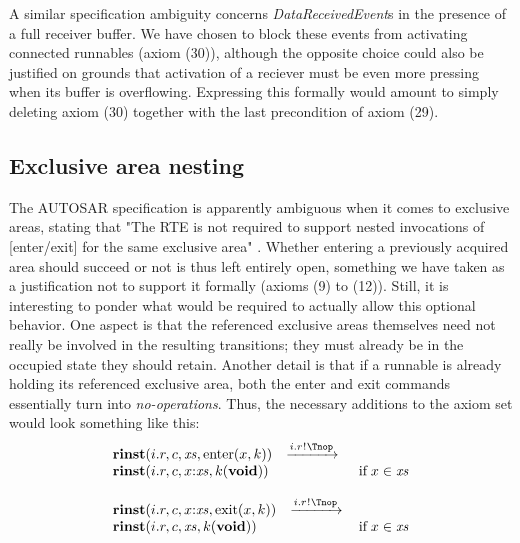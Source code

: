 \documentclass[twocolumn]{article}
\begin{document}
A similar specification ambiguity concerns \emph{DataReceivedEvent}s in the presence of a full receiver buffer. We have chosen to block these events from activating connected runnables (axiom (30)), although the opposite choice could also be justified on grounds that activation of a reciever must be even more pressing when its buffer is overflowing. Expressing this formally would amount to simply deleting axiom (30) together with the last precondition of axiom (29).


\subsection{Exclusive area nesting} \label{sec:ExclNest}

The AUTOSAR specification is apparently ambiguous when it comes to exclusive areas, stating that "The RTE is not required to support nested invocations of [enter/exit] for the same exclusive area" \cite[ch.~5.6.28-29]{AR:RTE}. Whether entering a previously acquired area should succeed or not is thus left entirely open, something we have taken as a justification not to support it formally (axioms (9) to (12)). Still, it is interesting to ponder what would be required to actually allow this optional behavior. One aspect is that the referenced exclusive areas themselves need not really be involved in the resulting transitions; they must already be in the occupied state they should retain. Another detail is that if a runnable is already holding its referenced exclusive area, both the enter and exit commands essentially turn into \emph{no-operations}. Thus, the necessary additions to the axiom set would look something like this:
$$
\begin{array}{lcll}
		{\Trinst {i.r} c \Xs {\TrteEnter x k}}
		\;\; \red{\Tsay {i.r} \Tnop} \\
		{\Trinst {i.r} c {\Tcons x \Xs} {\Tap k \Tvoid}}
		& \Pif\;x \in \Xs
\\ \\
		{\Trinst {i.r} c {\Tcons x \Xs} {\TrteExit x k}}
		\;\; \red{\Tsay {i.r} \Tnop} \\
		{\Trinst {i.r} c \Xs {\Tap k \Tvoid}}
		& \Pif\;x \in \Xs
\end{array}
$$
\end{document}

